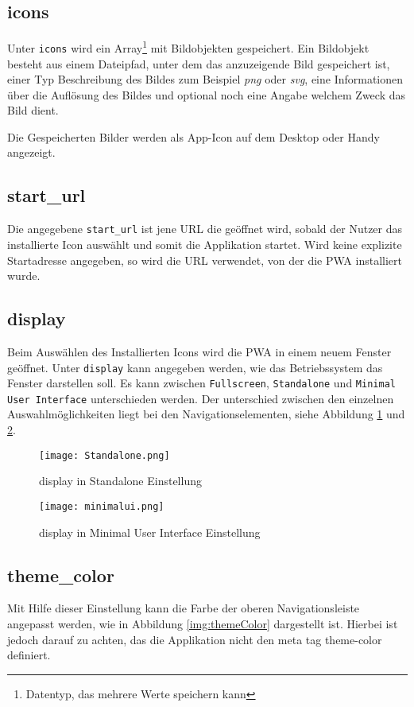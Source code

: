 \subsection{icons}
Unter \texttt{icons} wird ein Array\footnote{Datentyp, das mehrere Werte speichern kann} mit Bildobjekten gespeichert. Ein Bildobjekt besteht aus einem Dateipfad, unter dem das anzuzeigende Bild gespeichert ist, einer Typ Beschreibung des Bildes zum Beispiel \textit{png} oder \textit{svg}, eine Informationen über die Auflösung des Bildes und optional noch eine Angabe  welchem Zweck das Bild dient. 

Die Gespeicherten Bilder werden als App-Icon auf dem Desktop oder Handy angezeigt. 

\subsection{start\_url}
Die angegebene \texttt{start\_url} ist jene \ac{URL} die geöffnet wird, sobald der Nutzer das installierte Icon auswählt und somit die Applikation startet. 
Wird keine explizite Startadresse angegeben, so wird die URL verwendet, von der die PWA installiert wurde. 

\subsection{display}

Beim Auswählen des Installierten Icons wird die PWA in einem neuem Fenster geöffnet. Unter \texttt{display} kann angegeben werden, wie das Betriebssystem das Fenster darstellen soll. 
Es kann zwischen \texttt{Fullscreen}, \texttt{Standalone} und \texttt{Minimal User Interface} unterschieden werden. 
Der unterschied zwischen den einzelnen Auswahlmöglichkeiten liegt bei den Navigationselementen, siehe Abbildung \ref{img:Standalone} und \ref{img:minimalui}.

\begin{figure}[!htb]
    \texttt{[image: Standalone.png]}
    \caption{display in Standalone Einstellung}
    \label{img:Standalone}
\end{figure}

\begin{figure}
    \texttt{[image: minimalui.png]}
    \caption{display in Minimal User Interface Einstellung}
    \label{img:minimalui}
\end{figure}

\subsection{theme\_color}
Mit Hilfe dieser Einstellung kann die Farbe der oberen Navigationsleiste angepasst werden, wie in Abbildung \ref{img:themeColor} dargestellt ist. Hierbei ist jedoch darauf zu achten, das die Applikation nicht den meta tag theme-color definiert. 

